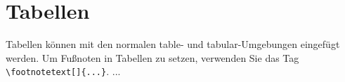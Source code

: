\documentclass[pdflatex,sn-mathphys-num]{sn-jnl}%
\theoremstyle{thmstyleone}%
\theoremstyle{thmstyletwo}%
\theoremstyle{thmstylethree}%
\begin{document}
\section{Tabellen}\label{sec5}

Tabellen können mit den normalen table- und tabular-Umgebungen eingefügt werden. Um Fußnoten in Tabellen zu setzen, verwenden Sie das Tag \verb+\footnotetext[]{...}+. ...

\end{document}
